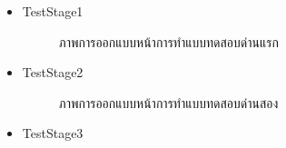 \documentclass[12pt,oneside,openright,a4paper]{cpe-thai-project}
\begin{document}
\begin{itemize}
\begin{figure}[!ht]
  \end{figure}
  \newpage
  \item TestStage1
  \begin{figure}[!ht]\centering
    \setlength{\fboxrule}{0.2mm} %
    \setlength{\fboxsep}{1cm}
    \caption{ภาพการออกแบบหน้าการทำแบบทดสอบด่านแรก}\label{fig:system}
  \end{figure}
  \item TestStage2
  \begin{figure}[!ht]\centering
    \setlength{\fboxrule}{0.2mm} %
    \setlength{\fboxsep}{1cm}
    \caption{ภาพการออกแบบหน้าการทำแบบทดสอบด่านสอง}\label{fig:system}
  \end{figure}
  \newpage
  \item TestStage3
  \begin{figure}[!ht]\centering
    \setlength{\fboxrule}{0.2mm} %
    \setlength{\fboxsep}{1cm}

\end{figure}
\end{itemize}
\end{document}

